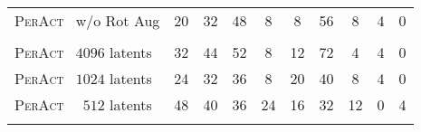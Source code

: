 \documentclass{article}
\newcommand{\model}{\textsc{PerAct}}
\begin{document}
\begin{table}[!b]
\begin{tabular}{lccccccccc}
\rowcolor[rgb]{0.898,1.0,0.953}\model~ w/o Rot Aug  & 20                                                    & 32                                                    & 48                                                         & 8                                                        & 8                                                   & 56                                                      & 8                                                   & 4                                                    & 0                                                      \\& \multicolumn{1}{l}{}                                  & \multicolumn{1}{l}{}                                  & \multicolumn{1}{l}{}                                       & \multicolumn{1}{l}{}                                     & \multicolumn{1}{l}{}                                & \multicolumn{1}{l}{} \\[-0.6em]
\rowcolor[rgb]{0.9,1.0,0.9}\model~ $4096$ latents & 32                                                    & 44                                                    & 52                                                         & 8                                                        & 12                                                  & 72                                                      & 4                                                   & 4                                                    & 0                                                      \\
\rowcolor[rgb]{0.9,1.0,0.9}\model~ $1024$ latents & 24                                                    & 32                                                    & 36                                                         & 8                                                        & 20                                                  & 40                                                      & 8                                                   & 4                                                    & 0                                                      \\
\rowcolor[rgb]{0.9,1.0,0.9}\model~ $\phantom{0}512$ latents  & 48                                                    & 40                                                    & 36                                                         & 24                                                       & 16                                                  & 32                                                      & 12                                                  & 0                                                    & 4                                                      \\& \multicolumn{1}{l}{}                                  & \multicolumn{1}{l}{}                                  & \multicolumn{1}{l}{}                                       & \multicolumn{1}{l}{}                                     & \multicolumn{1}{l}{}                                & \multicolumn{1}{l}{} \\[-0.6em]

\end{tabular}
\end{table}
\end{document}
